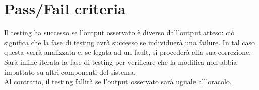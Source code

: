 \chapter{Pass/Fail criteria}
Il testing ha successo se l’output osservato è diverso dall’output atteso: ciò significa che la fase di testing avrà successo se individuerà una failure. In tal caso questa verrà analizzata e, se legata ad un fault, si procederà alla sua correzione. Sarà infine iterata la fase di testing per verificare che la modifica non abbia impattato su altri componenti del sistema.\\
Al contrario, il testing fallirà se l’output osservato sarà uguale all’oracolo. 
